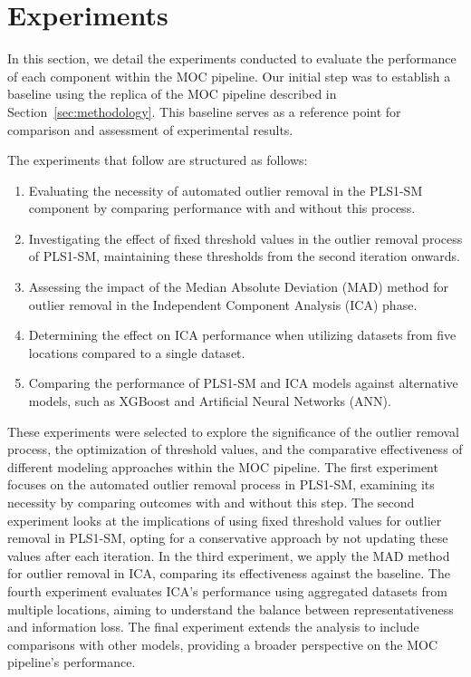 \section{Experiments}\label{sec:experiments}
In this section, we detail the experiments conducted to evaluate the performance of each component within the MOC pipeline.
Our initial step was to establish a baseline using the replica of the MOC pipeline described in Section~\ref{sec:methodology}.
This baseline serves as a reference point for comparison and assessment of experimental results.

The experiments that follow are structured as follows:

\begin{enumerate}
    \item Evaluating the necessity of automated outlier removal in the PLS1-SM component by comparing performance with and without this process.
    \item Investigating the effect of fixed threshold values in the outlier removal process of PLS1-SM, maintaining these thresholds from the second iteration onwards.
    \item Assessing the impact of the Median Absolute Deviation (MAD) method for outlier removal in the Independent Component Analysis (ICA) phase.
    \item Determining the effect on ICA performance when utilizing datasets from five locations compared to a single dataset.
    \item Comparing the performance of PLS1-SM and ICA models against alternative models, such as XGBoost and Artificial Neural Networks (ANN).
\end{enumerate}

These experiments were selected to explore the significance of the outlier removal process, the optimization of threshold values, and the comparative effectiveness of different modeling approaches within the MOC pipeline.
The first experiment focuses on the automated outlier removal process in PLS1-SM, examining its necessity by comparing outcomes with and without this step.
The second experiment looks at the implications of using fixed threshold values for outlier removal in PLS1-SM, opting for a conservative approach by not updating these values after each iteration.
In the third experiment, we apply the MAD method for outlier removal in ICA, comparing its effectiveness against the baseline.
The fourth experiment evaluates ICA's performance using aggregated datasets from multiple locations, aiming to understand the balance between representativeness and information loss.
The final experiment extends the analysis to include comparisons with other models, providing a broader perspective on the MOC pipeline's performance.


